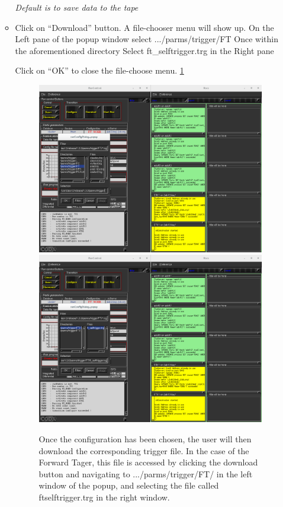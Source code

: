 \documentclass[11.5pt]{article}
\begin{document}
\begin{enumerate}
\begin{itemize}
\textit{Default is to save data to the tape}
\item{Click on ``Download'' button. A file-chooser menu will show up.
  On the Left pane of the popup window select .../parms/trigger/FT
  Once within the aforementioned directory Select ft\_selftrigger.trg in the Right pane

  Click on ``OK'' to close the file-choose menu. \ref{fig:SELFTRIG2}}

\begin{figure}[htbp]\centering
  \includegraphics[scale=0.3]{pics/SELF_TRIGGER_1.png}
  \includegraphics[scale=0.3]{pics/SELF_TRIGGER_2.png}
     \caption{Once the configuration has been chosen, the user will then download the corresponding trigger file. In the case of the Forward Tager, this file is accessed by clicking the download button and navigating to .../parms/trigger/FT/ in the left window of the popup, and selecting the file called ft\textunderscore selftrigger.trg in the right window.
       \label{fig:SELFTRIG2}}
\end{figure} 


\end{itemize}
\end{enumerate}
\end{document}
